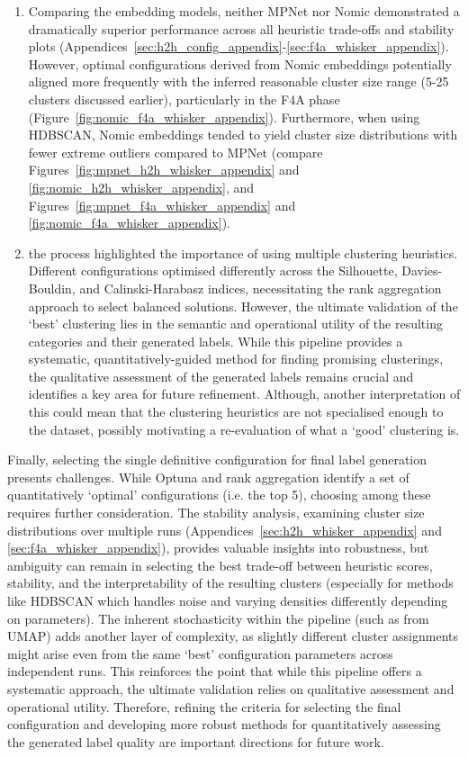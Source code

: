\documentclass[10pt,oneside]{report}
\begin{document}
\begin{enumerate}
    \item Comparing the embedding models, neither MPNet nor Nomic demonstrated a dramatically superior performance across all heuristic trade-offs and stability plots (Appendices~\ref{sec:h2h_config_appendix}-\ref{sec:f4a_whisker_appendix}). However, optimal configurations derived from Nomic embeddings potentially aligned more frequently with the inferred reasonable cluster size range (5-25 clusters discussed earlier), particularly in the F4A phase (Figure~\ref{fig:nomic_f4a_whisker_appendix}). Furthermore, when using HDBSCAN, Nomic embeddings tended to yield cluster size distributions with fewer extreme outliers compared to MPNet (compare Figures~\ref{fig:mpnet_h2h_whisker_appendix} and \ref{fig:nomic_h2h_whisker_appendix}, and Figures~\ref{fig:mpnet_f4a_whisker_appendix} and \ref{fig:nomic_f4a_whisker_appendix}).

    \item the process highlighted the importance of using multiple clustering heuristics. Different configurations optimised differently across the Silhouette, Davies-Bouldin, and Calinski-Harabasz indices, necessitating the rank aggregation approach to select balanced solutions. However, the ultimate validation of the `best' clustering lies in the semantic and operational utility of the resulting categories and their generated labels. While this pipeline provides a systematic, quantitatively-guided method for finding promising clusterings, the qualitative assessment of the generated labels remains crucial and identifies a key area for future refinement. Although, another interpretation of this could mean that the clustering heuristics are not specialised enough to the dataset, possibly motivating a re-evaluation of what a `good' clustering is.
\end{enumerate}


\noindent Finally, selecting the single definitive configuration for final label generation presents challenges. While Optuna and rank aggregation identify a set of quantitatively `optimal' configurations (i.e. the top 5), choosing among these requires further consideration. The stability analysis, examining cluster size distributions over multiple runs (Appendices~\ref{sec:h2h_whisker_appendix} and \ref{sec:f4a_whisker_appendix}), provides valuable insights into robustness, but ambiguity can remain in selecting the best trade-off between heuristic scores, stability, and the interpretability of the resulting clusters (especially for methods like HDBSCAN which handles noise and varying densities differently depending on parameters). The inherent stochasticity within the pipeline (such as from UMAP) adds another layer of complexity, as slightly different cluster assignments might arise even from the same `best' configuration parameters across independent runs. This reinforces the point that while this pipeline offers a systematic approach, the ultimate validation relies on qualitative assessment and operational utility. Therefore, refining the criteria for selecting the final configuration and developing more robust methods for quantitatively assessing the generated label quality are important directions for future work.
\end{document}
